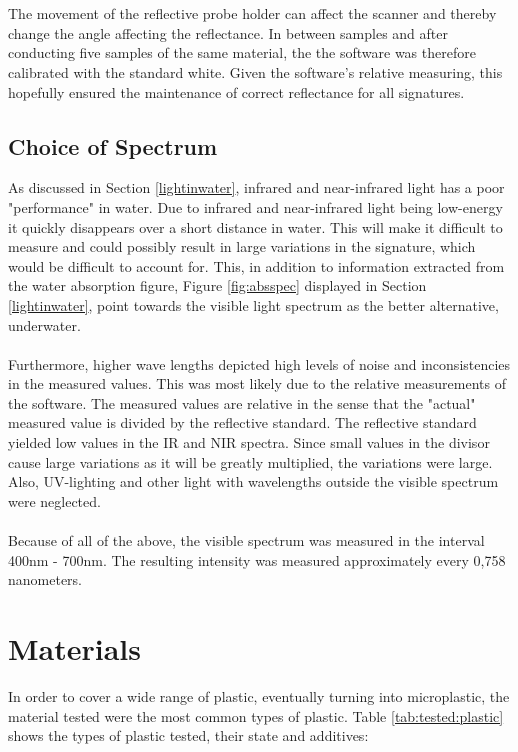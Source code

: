 \\\\
The movement of the reflective probe holder can affect the scanner and thereby change the angle affecting the reflectance. In between samples and after conducting five samples of the same material, the the software was therefore calibrated with the standard white. Given the software’s relative measuring, this hopefully ensured the maintenance of correct reflectance for all signatures.

\subsection{Choice of Spectrum}
As discussed in Section \ref{lightinwater}, infrared and near-infrared light has a poor "performance" in water. Due to infrared and near-infrared light being low-energy it quickly disappears over a short distance in water. This will make it difficult to measure and could possibly result in large variations in the signature, which would be difficult to account for. This, in addition to information extracted from the water absorption figure, Figure \ref{fig:absspec} displayed in Section \ref{lightinwater}, point towards the visible light spectrum as the better alternative, underwater.
\\\\
Furthermore, higher wave lengths depicted high levels of noise and inconsistencies in the measured values. This was most likely due to the relative measurements of the software. The measured values are relative in the sense that the "actual" measured value is divided by the reflective standard. The reflective standard yielded low values in the IR and NIR spectra. Since small values in the divisor cause large variations as it will be greatly multiplied, the variations were large. Also, UV-lighting and other light with wavelengths outside the visible spectrum were neglected.
\\\\
Because of all of the above, the visible spectrum was measured in the interval 400nm - 700nm. The resulting intensity was measured approximately every 0,758 nanometers. 

\section{Materials} \label{sec:material}
In order to cover a wide range of plastic, eventually turning into microplastic, the material tested were the most common types of plastic. Table \ref{tab:tested:plastic} shows the types of plastic tested, their state and additives:

